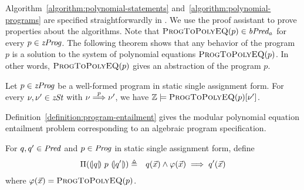Algorithm~\ref{algorithm:polynomial-statements}
and~\ref{algorithm:polynomial-programs} are specified straightforwardly
in \gallina. We use the proof assistant \coq to prove properties
about the algorithms. Note that $\textsc{ProgToPolyEQ}(p) \in
\mathit{bPred_a}$ for every $p \in \mathit{zProg}$. The following theorem shows that any
behavior of the program $p$ is a solution to the system of polynomial
equations $\textsc{ProgToPolyEQ}(p)$. In other words,
$\textsc{ProgToPolyEQ}(p)$ gives an abstraction of the program $p$.

\begin{theorem}
  Let $p \in \mathit{zProg}$ be a well-formed program in static single assignment
  form. For every $\nu, \nu' \in \mathit{zSt}$ with $\nu \overset{p}{\Longrightarrow} \nu'$,
  we have $\mathbb{Z} \models \textsc{ProgToPolyEQ}(p) [\nu']$.
\end{theorem}

Definition~\ref{definition:program-entailment} gives the modular
polynomial equation entailment problem corresponding to an algebraic
program specification.
\begin{definition}
  For $q, q' \in \mathit{Pred}$ and $p \in \mathit{Prog}$ in static single assignment
  form, define
  \begin{eqnarray*}
    \Pi({(\!|}{q}{|\!)}~{p}~{(\!|}{q'}{|\!)}) & \triangleq &
    q(\vec{x}) \wedge \varphi(\vec{x}) \implies q'(\vec{x})
  \end{eqnarray*}
  where $\varphi(\vec{x}) =
  \textsc{ProgToPolyEQ}(p)$. 
  \label{definition:program-entailment}
\end{definition}

